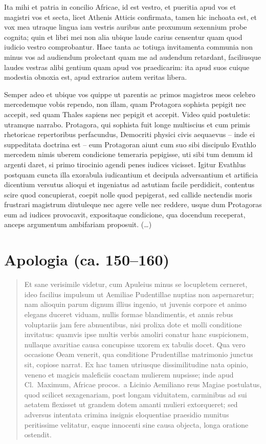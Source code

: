 Ita mihi et patria in concilio Africae, id est vestro, et pueritia apud vos et magistri vos et secta, licet Athenis Atticis confirmata, tamen hic inchoata est, et vox mea utraque lingua iam vestris auribus ante proxumum sexennium probe cognita; quin et libri mei non alia ubique laude carius censentur quam quod iudicio vestro comprobantur. Haec tanta ac totiuga invitamenta communia non minus vos ad audiendum prolectant quam me ad audendum retardant, faciliusque laudes vestras alibi gentium quam apud vos praedicarim: ita apud suos cuique modestia obnoxia est, apud extrarios autem veritas libera. 

Semper adeo et ubique vos quippe ut parentis ac primos magistros meos celebro mercedemque vobis rependo, non illam, quam Protagora sophista pepigit nec accepit, sed quam Thales sapiens nec pepigit et accepit. Video quid postuletis: utramque narrabo. Protagora, qui sophista fuit longe multiscius et cum primis rhetoricae repertoribus perfacundus, Democriti physici civis aequaevus – inde ei suppeditata doctrina est – eum Protagoran aiunt cum suo sibi discipulo Evathlo mercedem nimis uberem condicione temeraria pepigisse, uti sibi tum demum id argenti daret, si primo tirocinio agendi penes iudices vicisset. Igitur Evathlus postquam cuncta illa exorabula iudicantium et decipula adversantium et artificia dicentium versutus alioqui et ingeniatus ad astutiam facile perdidicit, contentus scire quod concupierat, coepit nolle quod pepigerat, sed callide nectendis moris frustrari magistrum diutuleque nec agere velle nec reddere, usque dum Protagoras eum ad iudices provocavit, expositaque condicione, qua docendum receperat, anceps argumentum ambifariam proposuit.  (\dots) 

\section*{Apologia (ca. 150–160)}
\begin{quotation}
\noindent Et sane verisimile videtur, cum Apuleius minus se locupletem cerneret, ideo facilius impulsum ut Aemiliae Pudentillae nuptias non aspernaretur; nam alioquin parum dignum illius ingenio, ut juvenis corpore et animo elegans duceret viduam, nullis formae blandimentis, et annis rebus voluptariis jam fere abnuentibus, nisi prolixa dote et molli conditione invitatus: quamvis ipse multis verbis amoliri conatur hanc suspicionem, nullaque avaritiae causa concupisse uxorem ex tabulis docet. Qua vero occasione Oeam venerit, qua conditione Prudentillae matrimonio junctus sit, copiose narrat. Ex hac tamen utriusque dissimilitudine nata opinio, veneno et magicis maleficiis coactam mulierem nupsisse; inde apud Cl.\ Maximum, Africae procos.\ a Licinio Aemiliano reus Magiae postulatus, quod scilicet sexagenariam, post longam viduitatem, carminibus ad sui aetatem flexisset ut grandem dotem amanti mulieri extorqueret; sed adversus intentata crimina insignis eloquentiae praesidio munitus peritissime velitatur, eaque innocenti sine causa objecta, longa oratione ostendit.
\end{quotation}

